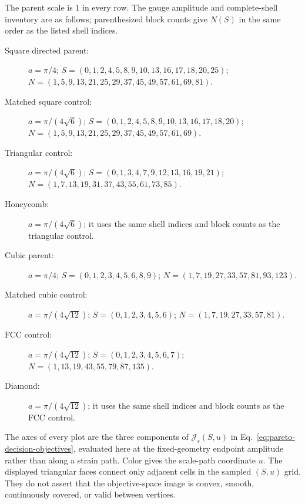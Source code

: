 The parent scale is $1$ in every row. The gauge amplitude and complete-shell inventory
are as follows; parenthesized block counts give $N(S)$ in the same order as the listed
shell indices.
\begin{description}
 \item[Square directed parent:] $a=\pi/4$;
 $S=(0,\allowbreak 1,\allowbreak 2,\allowbreak 4,\allowbreak 5,\allowbreak 8,\allowbreak 9,\allowbreak 10,\allowbreak 13,\allowbreak 16,\allowbreak 17,\allowbreak 18,\allowbreak 20,\allowbreak 25)$;
 $N=(1,\allowbreak 5,\allowbreak 9,\allowbreak 13,\allowbreak 21,\allowbreak 25,\allowbreak 29,\allowbreak 37,\allowbreak 45,\allowbreak 49,\allowbreak 57,\allowbreak 61,\allowbreak 69,\allowbreak 81)$.
 \item[Matched square control:] $a=\pi/(4\sqrt6)$;
 $S=(0,\allowbreak 1,\allowbreak 2,\allowbreak 4,\allowbreak 5,\allowbreak 8,\allowbreak 9,\allowbreak 10,\allowbreak 13,\allowbreak 16,\allowbreak 17,\allowbreak 18,\allowbreak 20)$;
 $N=(1,\allowbreak 5,\allowbreak 9,\allowbreak 13,\allowbreak 21,\allowbreak 25,\allowbreak 29,\allowbreak 37,\allowbreak 45,\allowbreak 49,\allowbreak 57,\allowbreak 61,\allowbreak 69)$.
 \item[Triangular control:] $a=\pi/(4\sqrt6)$;
 $S=(0,\allowbreak 1,\allowbreak 3,\allowbreak 4,\allowbreak 7,\allowbreak 9,\allowbreak 12,\allowbreak 13,\allowbreak 16,\allowbreak 19,\allowbreak 21)$;
 $N=(1,\allowbreak 7,\allowbreak 13,\allowbreak 19,\allowbreak 31,\allowbreak 37,\allowbreak 43,\allowbreak 55,\allowbreak 61,\allowbreak 73,\allowbreak 85)$.
 \item[Honeycomb:] $a=\pi/(4\sqrt6)$; it uses the same shell indices and block counts
 as the triangular control.
 \item[Cubic parent:] $a=\pi/4$;
 $S=(0,1,2,3,4,5,6,8,9)$; $N=(1,7,19,27,33,57,81,93,123)$.
 \item[Matched cubic control:] $a=\pi/(4\sqrt{12})$;
 $S=(0,1,2,3,4,5,6)$; $N=(1,7,19,27,33,57,81)$.
 \item[FCC control:] $a=\pi/(4\sqrt{12})$;
 $S=(0,1,2,3,4,5,6,7)$; $N=(1,13,19,43,55,79,87,135)$.
 \item[Diamond:] $a=\pi/(4\sqrt{12})$; it uses the same shell indices and block
 counts as the FCC control.
\end{description}

The axes of every plot are the three components of
$\mathcal J_s(S,u)$ in Eq.~\eqref{eq:pareto-decision-objectives}, evaluated here at the
fixed-geometry endpoint amplitude rather than along a strain path. Color gives the
scale-path coordinate $u$. The displayed triangular faces connect only adjacent cells in
the sampled $(S,u)$ grid. They do not assert that the objective-space image is convex,
smooth, continuously covered, or valid between vertices.

